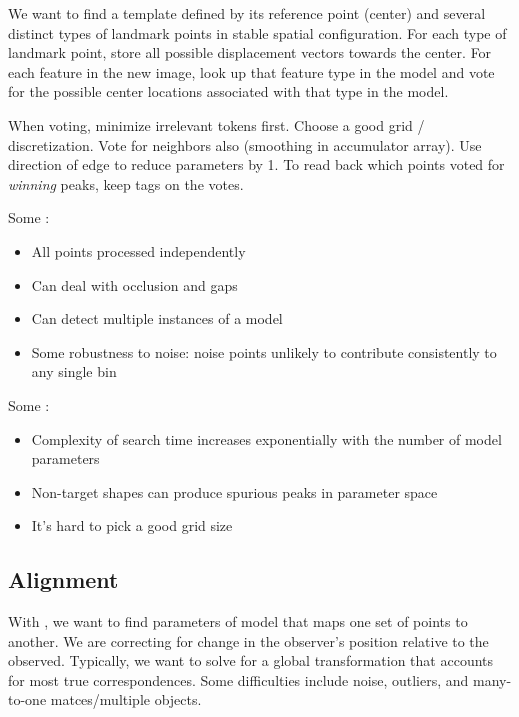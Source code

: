\documentclass{article}
\begin{document}
\begin{definition}
  We want to find a template defined by its reference point (center) and several distinct types of landmark points in stable spatial configuration. For each type of landmark point, store all possible displacement vectors towards the center. For each feature in the new image, look up that feature type in the model and vote for the possible center locations associated with that type in the model. 
\end{definition}

\begin{remark}
  When voting, minimize irrelevant tokens first. Choose a good grid / discretization. Vote for neighbors also (smoothing in accumulator array). Use direction of edge to reduce parameters by 1. To read back which points voted for \emph{winning} peaks, keep tags on the votes. 
\end{remark}

Some :
\begin{itemize}
  \item All points processed independently 
  \item Can deal with occlusion and gaps 
  \item Can detect multiple instances of a model 
  \item Some robustness to noise: noise points unlikely to contribute consistently to any single bin 
\end{itemize}

Some :
\begin{itemize}
  \item Complexity of search time increases exponentially with the number of model parameters 
  \item Non-target shapes can produce spurious peaks in parameter space 
  \item It's hard to pick a good grid size
\end{itemize}

\subsection{Alignment}

With , we want to find parameters of model that maps one set of points to another. We are correcting for change in the observer's position relative to the observed. Typically, we want to solve for a global transformation that accounts for most true correspondences. Some difficulties include noise, outliers, and many-to-one matces/multiple objects. 
\end{document}

